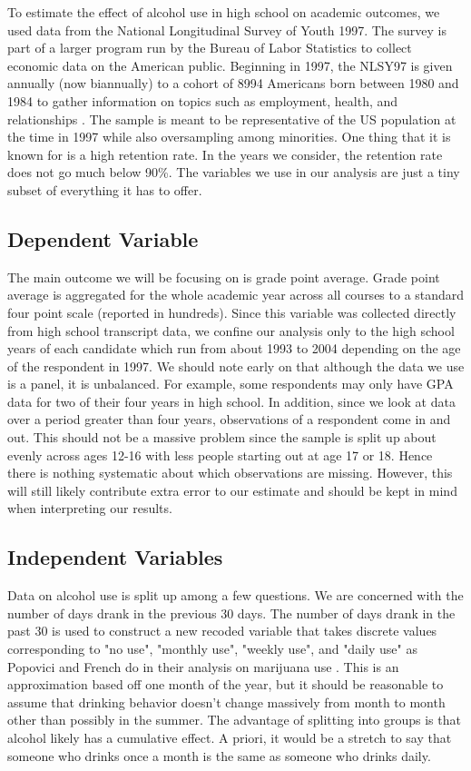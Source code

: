 \documentclass[11pt]{article}
\begin{document}
To estimate the effect of alcohol use in high school on academic outcomes, we used data from the National Longitudinal Survey of Youth 1997. The survey is part of a larger program run by the Bureau of Labor Statistics to collect economic data on the American public. Beginning in 1997, the NLSY97 is given annually (now biannually) to a cohort of 8994 Americans born between 1980 and 1984 to gather information on topics such as employment, health, and relationships \cite{nls}. The sample is meant to be representative of the US population at the time in 1997 while also oversampling among minorities. One thing that it is known for is a high retention rate. In the years we consider, the retention rate does not go much below 90\%. The variables we use in our analysis are just a tiny subset of everything it has to offer. 

\subsection*{Dependent Variable}
The main outcome we will be focusing on is grade point average. Grade point average is aggregated for the whole academic year across all courses to a standard four point scale (reported in hundreds). Since this variable was collected directly from high school transcript data, we confine our analysis only to the high school years of each candidate which run from about 1993 to 2004 depending on the age of the respondent in 1997. We should note early on that although the data we use is a panel, it is unbalanced. For example, some respondents may only have GPA data for two of their four years in high school. In addition, since we look at data over a period greater than four years, observations of a respondent come in and out. This should not be a massive problem since the sample is split up about evenly across ages 12-16 with less people starting out at age 17 or 18. Hence there is nothing systematic about which observations are missing. However, this will still likely contribute extra error to our estimate and should be kept in mind when interpreting our results.

\subsection*{Independent Variables}
Data on alcohol use is split up among a few questions. We are concerned with the number of days drank in the previous 30 days.  The number of days drank in the past 30 is used to construct a new recoded variable that takes discrete values corresponding to "no use", "monthly use", "weekly use", and "daily use" as Popovici and French do in their analysis on marijuana use \cite{popovici2014cannabis}. This is an approximation based off one month of the year, but it should be reasonable to assume that drinking behavior doesn't change massively from month to month other than possibly in the summer. The advantage of splitting into groups is that alcohol likely has a cumulative effect. A priori, it would be a stretch to say that someone who drinks once a month is the same as someone who drinks daily.  
\end{document}
